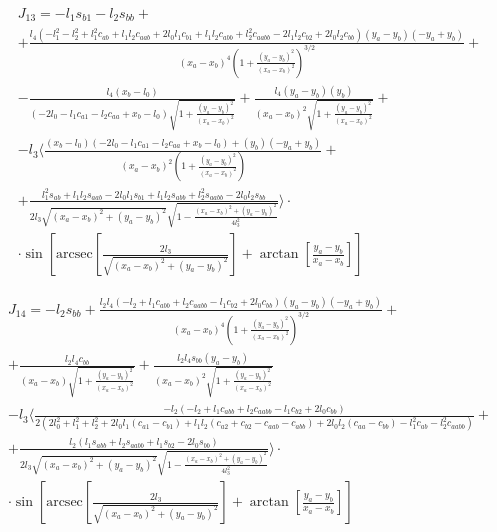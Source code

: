 \documentclass[printmode]{mgr}
\begin{document}
\begin{multline*}
J_{13} = 
 -l_1 s_{b1}-l_2 s_{bb}+\\
 +\frac{l_4 \left(-l_1^2-l_2^2+l_1^2 c_{ab}+l_1 l_2 c_{aab}+2 l_0 l_1 c_{b1}+l_1 l_2 c_{abb}+l_2^2 c_{aabb}-2 l_1 l_2 c_{b2}+2 l_0 l_2 c_{bb}\right) (y_a - y_b) (-y_a+y_b)}{(x_a - x_b)^4 \left(1+\frac{(y_a - y_b)^2}{(x_a - x_b)^2}\right)^{3/2}}+\\
 -\frac{l_4 (x_b - l_0)}{(-2 l_0-l_1 c_{a1}-l_2 c_{aa}+x_b - l_0) \sqrt{1+\frac{(y_a - y_b)^2}{(x_a - x_b)^2}}}+\frac{l_4 (y_a - y_b) (y_b)}{(x_a - x_b)^2 \sqrt{1+\frac{(y_a - y_b)^2}{(x_a - x_b)^2}}}+
 \\
 -l_3 \langle\frac{(x_b - l_0) (-2 l_0-l_1 c_{a1}-l_2 c_{aa}+x_b - l_0)+(y_b) (-y_a+y_b)}{(x_a - x_b)^2 \left(1+\frac{(y_a - y_b)^2}{(x_a - x_b)^2}\right)}+\\
 +\frac{l_1^2 s_{ab}+l_1 l_2 s_{aab}-2 l_0 l_1 s_{b1}+l_1 l_2 s_{abb}+l_2^2 s_{aabb}-2 l_0 l_2 s_{bb}}{2 l_3 \sqrt{(x_a - x_b)^2+(y_a - y_b)^2} \sqrt{1-\frac{(x_a - x_b)^2+(y_a - y_b)^2}{4 l_3^2}}}\rangle \cdot 
 \\
 \cdot \sin\left[\text{arcsec}\left[\frac{2 l_3}{\sqrt{(x_a - x_b)^2+(y_a - y_b)^2}}\right]+\arctan\left[\frac{y_a - y_b}{x_a - x_b}\right]\right] 
\end{multline*}

\begin{multline*}
J_{14} = 
 -l_2 s_{bb}+\frac{l_2 l_4 (-l_2+l_1 c_{abb}+l_2 c_{aabb}-l_1 c_{b2}+2 l_0 c_{bb}) (y_a - y_b) (-y_a+y_b)}{(x_a - x_b)^4 \left(1+\frac{(y_a - y_b)^2}{(x_a - x_b)^2}\right)^{3/2}}+\\
 +\frac{l_2 l_4 c_{bb}}{(x_a - x_b) \sqrt{1+\frac{(y_a - y_b)^2}{(x_a - x_b)^2}}} +\frac{l_2 l_4 s_{bb} (y_a - y_b)}{(x_a - x_b)^2 \sqrt{1+\frac{(y_a - y_b)^2}{(x_a - x_b)^2}}}
 \\
 -l_3 \langle\frac{-l_2 (-l_2+l_1 c_{abb}+l_2 c_{aabb}-l_1 c_{b2}+2 l_0 c_{bb})}{2 \left(2 l_0^2+l_1^2+l_2^2+2 l_0 l_1 (c_{a1}-c_{b1})+l_1 l_2 (c_{a2} + c_{b2} - c_{aab} - c_{abb} )+2 l_0 l_2 (c_{aa}-c_{bb})-l_1^2 c_{ab}-l_2^2 c_{aabb}\right)}+
 \\
 +\frac{l_2 (l_1 s_{abb}+l_2 s_{aabb}+l_1 s_{b2}-2 l_0 s_{bb})}{2 l_3 \sqrt{(x_a - x_b)^2+(y_a - y_b)^2} \sqrt{1-\frac{(x_a - x_b)^2+(y_a - y_b)^2}{4 l_3^2}}}\rangle \cdot 
 \\
 \cdot \sin\left[\text{arcsec}\left[\frac{2 l_3}{\sqrt{(x_a - x_b)^2+(y_a - y_b)^2}}\right]+\arctan\left[\frac{y_a - y_b}{x_a - x_b}\right]\right]
\end{multline*}
\end{document}
